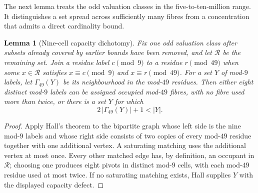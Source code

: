 \documentclass[11pt]{article}
\newtheorem{lemma}[theorem]{Lemma}
\theoremstyle{definition}
\begin{document}
 The next lemma treats the odd valuation classes in the five-to-ten-million
 range.  It distinguishes a set spread across sufficiently many fibres from a
 concentration that admits a direct cardinality bound.

\begin{lemma}[Nine-cell capacity dichotomy]\label{lem:nine-cell-capacity}
 Fix one odd valuation class after subsets already covered by earlier bounds
 have been removed, and let $\mathcal R$ be the remaining set.  Join a
residue label $c\pmod 9$ to a residue $r\pmod {49}$ when some $x\in\mathcal R$
satisfies $x\equiv c\pmod 9$ and $x\equiv r\pmod {49}$.  For a set $Y$ of
mod-$9$ labels, let $\Gamma_{49}(Y)$ be its neighbourhood in the mod-$49$
residues.  Then either eight distinct mod-$9$ labels can be assigned occupied
mod-$49$ fibres, with no fibre used more than twice, or there is a set $Y$ for
which
\[
  2\,|\Gamma_{49}(Y)|+1<|Y|.
\]
\end{lemma}

\begin{proof}
Apply Hall's theorem to the bipartite graph whose left side is the nine
mod-$9$ labels and whose right side consists of two copies of every mod-$49$
 residue together with one additional vertex.  A saturating matching uses the additional vertex
at most once.  Every other matched edge has, by definition, an occupant in
$\mathcal R$; choosing one produces eight pivots in distinct mod-$9$ cells,
with each mod-$49$ residue used at most twice.  If no saturating matching
exists, Hall supplies $Y$ with the displayed capacity defect.
\end{proof}
\end{document}
